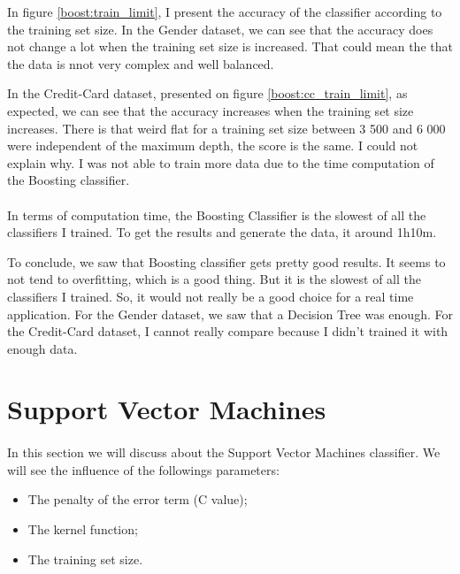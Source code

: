 \documentclass[10pt]{article}
\begin{document}
			In figure \ref{boost:train_limit}, I present the accuracy of the classifier according to the training set size.
			In the Gender dataset, we can see that the accuracy does not change a lot when the training set size is increased. That could mean the that the data is nnot very complex and well balanced.

			In the Credit-Card dataset, presented on figure \ref{boost:cc_train_limit}, as expected, we can see that the accuracy increases when the training set size increases. There is that weird flat for a training set size between 3 500 and 6 000 were independent of the maximum depth, the score is the same. I could not explain why.
			I was not able to train more data due to the time computation of the Boosting classifier.

		\paragraph*{}
			In terms of computation time, the Boosting Classifier is the slowest of all the classifiers I trained. To get the results and generate the data, it around 1h10m.

			To conclude, we saw that Boosting classifier gets pretty good results. It seems to not tend to overfitting, which is a good thing. But it is the slowest of all the classifiers I trained. So, it would not really be a good choice for a real time application. For the Gender dataset, we saw that a Decision Tree was enough. For the Credit-Card dataset, I cannot really compare because I didn't trained it with enough data.
	\section{Support Vector Machines}
		\paragraph*{}
			In this section we will discuss about the Support Vector Machines classifier. We will see the influence of the followings parameters:
			\begin{itemize}
				\item The penalty of the error term (C value);
				\item The kernel function;
				\item The training set size.
			\end{itemize}
\end{document}
